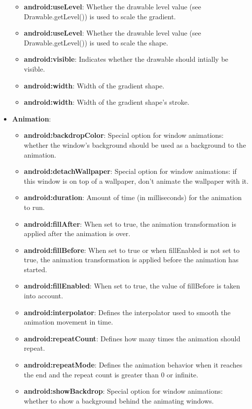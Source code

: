 \documentclass{report}
\begin{document}
\begin{itemize}
\begin{itemize}
                \item \textbf{android:useLevel}:	Whether the drawable level value (see Drawable.getLevel()) is used to scale the gradient. 
                \item \textbf{android:useLevel}:	Whether the drawable level value (see Drawable.getLevel()) is used to scale the shape. 
                \item \textbf{android:visible}:	Indicates whether the drawable should intially be visible. 
                \item \textbf{android:width}:	Width of the gradient shape. 
                \item \textbf{android:width}:	Width of the gradient shape's stroke. 
            \end{itemize}
        \item \textbf{Animation}:
            \begin{itemize}
                \item \textbf{android:backdropColor}:	Special option for window animations: whether the window's background should be used as a background to the animation. 
                \item \textbf{android:detachWallpaper}:	Special option for window animations: if this window is on top of a wallpaper, don't animate the wallpaper with it. 
                \item \textbf{android:duration}:	Amount of time (in milliseconds) for the animation to run. 
                \item \textbf{android:fillAfter}:	When set to true, the animation transformation is applied after the animation is over. 
                \item \textbf{android:fillBefore}:	When set to true or when fillEnabled is not set to true, the animation transformation is applied before the animation has started. 
                \item \textbf{android:fillEnabled}:	When set to true, the value of fillBefore is taken into account. 
                \item \textbf{android:interpolator}:	Defines the interpolator used to smooth the animation movement in time. 
                \item \textbf{android:repeatCount}:	Defines how many times the animation should repeat. 
                \item \textbf{android:repeatMode}:	Defines the animation behavior when it reaches the end and the repeat count is greater than 0 or infinite. 
                \item \textbf{android:showBackdrop}:	Special option for window animations: whether to show a background behind the animating windows. 

\end{itemize}
\end{itemize}
\end{document}
